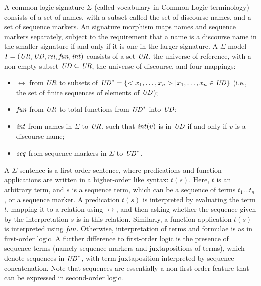 \documentclass[10pt,fleqn,%
\ifpretendfinal
final%
\else
draft%
\fi,
]{scrreprt}
\begin{document}
\begin{definition}\label{CommonLogic}   
A common logic signature
$\Sigma$ (called vocabulary in Common Logic terminology) consists of a
set of names, with a subset called the set of discourse names, and a
set of sequence markers. An signature morphism maps
names and sequence markers separately, subject to the requirement
 that a name is a discourse
name in the smaller signature if and only if it is one in the larger signature.  A $\Sigma$-model $I=(\mathit{UR},\mathit{UD},\mathit{rel},\mathit{fun},\mathit{int})$ consists of a set $\mathit{UR}$,
the universe of reference, with a non-empty subset $\mathit{UD}\subseteq \mathit{UR}$,
the universe of discourse, and four mappings:
  \begin{itemize}
   \item $\rel$ from $\mathit{UR}$ to subsets of $\mathit{UD}^* = \{<x_1,\ldots,x_n> |
x_1,\ldots,x_n \in \mathit{UD}\}$ (i.e., the set of finite sequences of
elements of $\mathit{UD}$);
   \item $\mathit{fun}$ from $\mathit{UR}$ to total functions from $\mathit{UD}^*$ into $\mathit{UD}$;
   \item $\mathit{int}$ from names in $\Sigma$ to $\mathit{UR}$, such that
$\mathit{int}(v)$ is in $\mathit{UD}$ if and only if $v$ is a discourse name;
   \item $\mathit{seq}$ from sequence markers in $\Sigma$ to $\mathit{UD}^*$.
  \end{itemize}  A $\Sigma$-sentence is a first-order
sentence, where predications and function applications are written
in a higher-order like syntax: $t(s)$.
Here, $t$ is an arbitrary term, and $s$ is a sequence term, which can
be a sequence of terms $t_1\ldots t_n$, or a sequence marker.
A predication $t(s)$ is interpreted by evaluating the term $t$,
mapping it to a relation using $\rel$, and then asking whether the sequence
given by the interpretation $s$ is in this relation.  
Similarly, a function application $t(s)$ is interpreted using $\mathit{fun}$.
Otherwise, interpretation of terms and formulae is as in
first-order logic. 
A further
difference to first-order logic
is the presence of sequence terms (namely sequence markers and
juxtapositions of terms), which denote sequences in $\mathit{UD}^*$, with term
juxtaposition interpreted by sequence concatenation.
Note that sequences are essentially a non-first-order feature that
can be expressed in second-order logic.


\end{definition}
\end{document}
